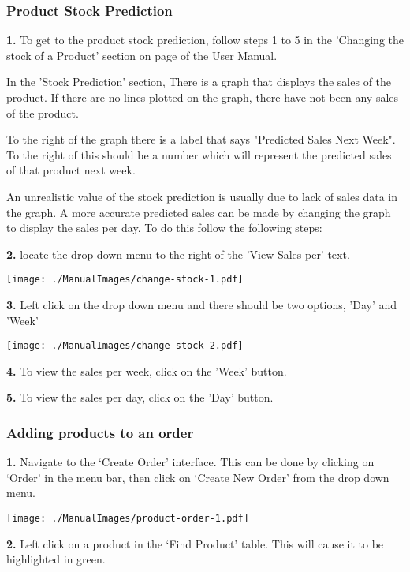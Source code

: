 \pagebreak
\subsubsection{Product Stock Prediction}
\label{fig:Product Stock Prediction}

\textbf{1.} To get to the product stock prediction, follow steps 1 to 5 in the 'Changing the stock of a Product' section on page \pageref{fig:Changing the stock of a Product} of the User Manual.

In the 'Stock Prediction' section, There is a graph that displays the sales of the product. If there are no lines plotted on the graph, there have not been any sales of the product.

To the right of the graph there is a label that says "Predicted Sales Next Week". To the right of this should be a number which will represent the predicted sales of that product next week.

An unrealistic value of the stock prediction is usually due to lack of sales data in the graph. A more accurate predicted sales can be made by changing the graph to display the sales per day. To do this follow the following steps:

\textbf{2.} locate the drop down menu to the right of the 'View Sales per' text.

\texttt{[image: ./ManualImages/change-stock-1.pdf]}

\textbf{3.} Left click on the drop down menu and there should be two options, 'Day' and 'Week'

\texttt{[image: ./ManualImages/change-stock-2.pdf]}

\textbf{4.} To view the sales per week, click on the 'Week' button.

\textbf{5.} To view the sales per day, click on the 'Day' button.

\pagebreak
\subsubsection{Adding products to an order}
\label{fig:Adding products to an order}

\textbf{1.} Navigate to the `Create Order' interface. This can be done by clicking on `Order' in the menu bar, then click on `Create New Order' from the drop down menu.

\texttt{[image: ./ManualImages/product-order-1.pdf]}

\textbf{2.} Left click on a product in the `Find Product' table. This will cause it to be highlighted in green.

